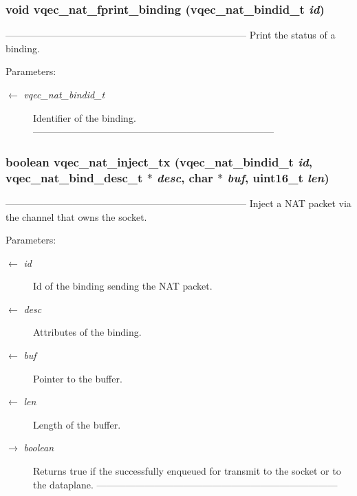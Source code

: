 \subsubsection{\setlength{\rightskip}{0pt plus 5cm}void vqec\_\-nat\_\-fprint\_\-binding (vqec\_\-nat\_\-bindid\_\-t {\em id})}\label{vqec__nat__api_8c_09109143f3deb6fef2d3023a748f06c4}


--------------------------------------------------------------------------- Print the status of a binding.

\begin{Desc}
\item[Parameters:]
\begin{description}
\item[\mbox{$\leftarrow$} {\em vqec\_\-nat\_\-bindid\_\-t}]Identifier of the binding. --------------------------------------------------------------------------- \end{description}
\end{Desc}
\subsubsection{\setlength{\rightskip}{0pt plus 5cm}boolean vqec\_\-nat\_\-inject\_\-tx (vqec\_\-nat\_\-bindid\_\-t {\em id}, vqec\_\-nat\_\-bind\_\-desc\_\-t $\ast$ {\em desc}, char $\ast$ {\em buf}, uint16\_\-t {\em len})}\label{vqec__nat__api_8c_3f50d5f51249a0c261a53d8fa07fb74e}


--------------------------------------------------------------------------- Inject a NAT packet via the channel that owns the socket.

\begin{Desc}
\item[Parameters:]
\begin{description}
\item[\mbox{$\leftarrow$} {\em id}]Id of the binding sending the NAT packet. \item[\mbox{$\leftarrow$} {\em desc}]Attributes of the binding. \item[\mbox{$\leftarrow$} {\em buf}]Pointer to the buffer. \item[\mbox{$\leftarrow$} {\em len}]Length of the buffer. \item[\mbox{$\rightarrow$} {\em boolean}]Returns true if the successfully enqueued for transmit to the socket or to the dataplane. --------------------------------------------------------------------------- \end{description}
\end{Desc}
